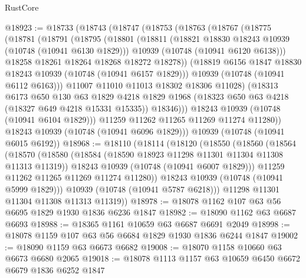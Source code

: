 \begin{lexlean}{RustCore}
\begin{coremodule}
@18923 := @18733
    (@18743
      (@18747
        (@18753
          (@18763
            (@18767
              (@18775
                (@18781
                  (@18791
                    (@18795
                      (@18801
                        (@18811
                          (@18821 @18830 @18243 @10939 (@10748 (@10941 @6130 @1829)))
                          @10939
                          (@10748 (@10941 @6120 @6138)))
                        @18258
                        @18261
                        @18264
                        @18268
                        @18272
                        @18278))
                    (@18819 @6156 @1847 @18830 @18243 @10939 (@10748 (@10941 @6157 @1829)))
                    @10939
                    (@10748 (@10941 @6112 @6163)))
                  @11007
                  @11010
                  @11013
                  @18302
                  @18306
                  @11028)
                (@18313
                  @6173
                  @650
                  @130
                  @63
                  @1829
                  @4218
                  @1829
                  @1968
                  (@18323 @650 @63 @4218 (@18327 @649 @4218 @15331 @15335))
                  @18346)))
            @18243
            @10939
            (@10748 (@10941 @6104 @1829)))
          @11259
          @11262
          @11265
          @11269
          @11274
          @11280))
      @18243
      @10939
      (@10748 (@10941 @6096 @1829)))
    @10939
    (@10748 (@10941 @6015 @6192))
@18968 := @18110
    (@18114
      (@18120
        (@18550
          (@18560
            (@18564
              (@18570
                (@18580
                  (@18584 (@18590 @18923 @11298 @11301 @11304 @11308 @11313 @11319))
                  @18243
                  @10939
                  (@10748 (@10941 @6007 @1829)))
                @11259
                @11262
                @11265
                @11269
                @11274
                @11280))
            @18243
            @10939
            (@10748 (@10941 @5999 @1829)))
          @10939
          (@10748 (@10941 @5787 @6218)))
        @11298
        @11301
        @11304
        @11308
        @11313
        @11319))
@18978 := @18078 @1162 @107 @63 @56 @6695 @1829 @1930 @1836 @6236 @1847
@18982 := @18090 @1162 @63 @6687 @6693
@18988 := @18365 @1161 @10659 @63 @6687 @6691 @2049
@18998 := @18078 @1159 @107 @63 @56 @6684 @1829 @1930 @1836 @6244 @1847
@19002 := @18090 @1159 @63 @6673 @6682
@19008 := @18070 @1158 @10660 @63 @6673 @6680 @2065
@19018 := @18078 @1113 @1157 @63 @10659 @6450 @6672 @6679 @1836 @6252 @1847

\end{coremodule}
\end{lexlean}
